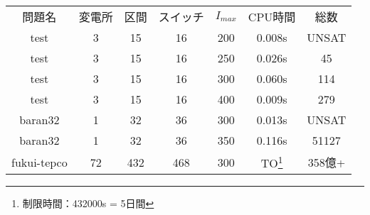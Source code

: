 \begin{tabular}[t]{ccccccc}
 \rowcolor[RGB]{0,96,0}
 \color{white}問題名 & \color{white}変電所 & \color{white}区間 & \color{white}スイッチ & 
                 \color{white}$I_{max}$ & \color{white}CPU時間 & \color{white}総数 \\
 \rowcolor[RGB]{230,239,230}
 test & 3 & 15 & 16 & 200 & 0.008s & UNSAT \\
 \rowcolor[RGB]{196,230,196}
 test & 3 & 15 & 16 & 250 & 0.026s & 45 \\
 \rowcolor[RGB]{230,239,230}
 test & 3 & 15 & 16 & 300 & 0.060s & 114 \\
 \rowcolor[RGB]{196,230,196}
 test & 3 & 15 & 16 & 400 & 0.009s & 279 \\
 \rowcolor[RGB]{230,239,230}
 baran32 & 1 & 32 & 36 & 300 & 0.013s & UNSAT \\
 \rowcolor[RGB]{196,230,196}
 baran32 & 1 & 32 & 36 & 350 & 0.116s & 51127 \\
 \rowcolor[RGB]{230,239,230}
 fukui-tepco & 72 & 432 & 468 & 300 & TO\footnote{制限時間：432000s = 5日間} & 358億+  
\end{tabular}
